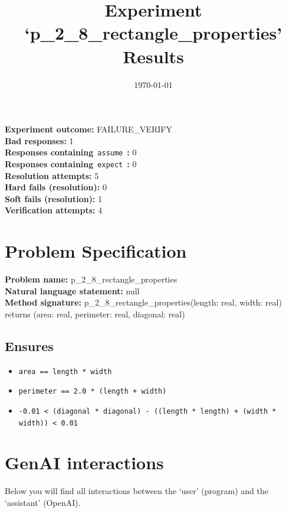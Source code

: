 \documentclass{article}
\begin{document}
\title{Experiment `p\_2\_8\_rectangle\_properties' Results}
\author{\today}
\date{}
\maketitle
\textbf{Experiment outcome: }FAILURE\_VERIFY
\\\textbf{Bad responses: }1
\\\textbf{Responses containing}~\texttt{assume}~\textbf{: }0
\\\textbf{Responses containing}~\texttt{expect}~\textbf{: }0
\\\textbf{Resolution attempts: }5
\\\textbf{Hard fails (resolution): }0
\\\textbf{Soft fails (resolution): }1
\\\textbf{Verification attempts: }4
\section*{Problem Specification}
\textbf{Problem name: }p\_2\_8\_rectangle\_properties
\\\textbf{Natural language statement: }null
\\\textbf{Method signature: }p\_2\_8\_rectangle\_properties(length: real, width: real) returns (area: real, perimeter: real, diagonal: real)
\subsection*{Ensures}
\begin{itemize}
\item \texttt{area == length * width}
\item \texttt{perimeter == 2.0 * (length + width)}
\item \texttt{-0.01 < (diagonal * diagonal) - ((length * length) + (width * width)) < 0.01}
\end{itemize}
\clearpage
\section*{GenAI interactions}
Below you will find all interactions between the `user' (program) and the `assistant' (OpenAI).
\end{document}

